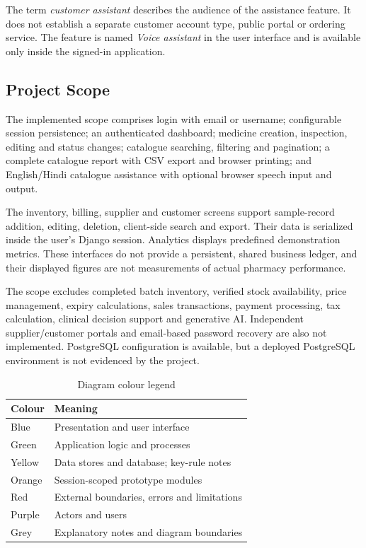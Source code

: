 \documentclass[11pt,a4paper]{article}
\begin{document}
The term \emph{customer assistant} describes the audience of the assistance feature. It does not establish a separate customer account type, public portal or ordering service. The feature is named \emph{Voice assistant} in the user interface and is available only inside the signed-in application.

\subsection{Project Scope}
The implemented scope comprises login with email or username; configurable session persistence; an authenticated dashboard; medicine creation, inspection, editing and status changes; catalogue searching, filtering and pagination; a complete catalogue report with CSV export and browser printing; and English/Hindi catalogue assistance with optional browser speech input and output.

The inventory, billing, supplier and customer screens support sample-record addition, editing, deletion, client-side search and export. Their data is serialized inside the user's Django session. Analytics displays predefined demonstration metrics. These interfaces do not provide a persistent, shared business ledger, and their displayed figures are not measurements of actual pharmacy performance.

The scope excludes completed batch inventory, verified stock availability, price management, expiry calculations, sales transactions, payment processing, tax calculation, clinical decision support and generative AI. Independent supplier/customer portals and email-based password recovery are also not implemented. PostgreSQL configuration is available, but a deployed PostgreSQL environment is not evidenced by the project.

\begin{table}[H]\centering\small
\caption{Diagram colour legend}\label{tab:legend}
\begin{tabularx}{\textwidth}{@{}YY@{}}
\toprule Colour & Meaning\\\midrule
{}Blue & Presentation and user interface\\
Green & Application logic and processes\\
Yellow & Data stores and database; key-rule notes\\
Orange & Session-scoped prototype modules\\
Red & External boundaries, errors and limitations\\
Purple & Actors and users\\
Grey & Explanatory notes and diagram boundaries\\
\bottomrule\end{tabularx}
\end{table}
\end{document}
